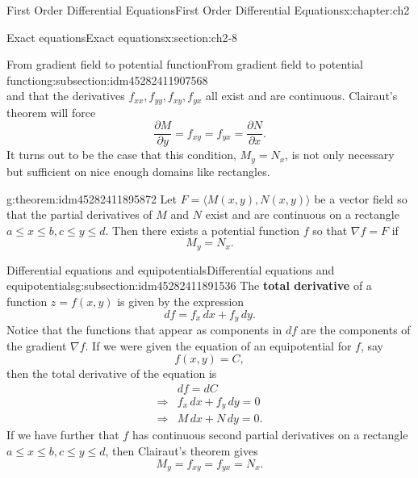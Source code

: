 \documentclass[oneside,10pt,]{book}
\newcommand{\terminology}[1]{\textbf{#1}}
\numberwithin{equation}{section}
\numberwithin{equation}{section}
\newcommand{\amp}{&}
\begin{document}
\begin{chapterptx}{First Order Differential Equations}{}{First Order Differential Equations}{}{}{x:chapter:ch2}
\begin{sectionptx}{Exact equations}{}{Exact equations}{}{}{x:section:ch2-8}
\begin{subsectionptx}{From gradient field to potential function}{}{From gradient field to potential function}{}{}{g:subsection:idm45282411907568}
\begin{equation*}
\end{equation*}
and that the derivatives \(f_{xx}, f_{yy}, f_{xy}, f_{yx}\) all exist and are continuous. Clairaut's theorem will force%
\begin{equation*}
\frac{\partial M}{\partial y} = f_{xy} = f_{yx} = \frac{\partial N}{\partial x}\text{.}
\end{equation*}
It turns out to be the case that this condition, \(M_y = N_x\), is not only necessary but sufficient on nice enough domains like rectangles.%
\begin{theorem}{}{}{g:theorem:idm45282411895872}%
Let \(F = \langle M(x,y), N(x,y) \rangle\) be a vector field so that the partial derivatives of \(M\) and \(N\) exist and are continuous on a rectangle \(a \leq x \leq b, c \leq y \leq d\). Then there exists a potential function \(f\) so that \(\nabla f = F\) if%
\begin{equation*}
M_y = N_x.
\end{equation*}
%
\end{theorem}
\end{subsectionptx}
%
%
\typeout{************************************************}
\typeout{************************************************}
%
\begin{subsectionptx}{Differential equations and equipotentials}{}{Differential equations and equipotentials}{}{}{g:subsection:idm45282411891536}
The \terminology{total derivative} of a function \(z = f(x,y)\) is given by the expression%
\begin{equation*}
df = f_x \, dx + f_y \, dy.
\end{equation*}
Notice that the functions that appear as components in \(df\) are the components of the gradient \(\nabla f\). If we were given the equation of an equipotential for \(f\), say%
\begin{equation*}
f(x, y) = C,
\end{equation*}
then the total derivative of the equation is%
\begin{align*}
\amp df = dC \\
\Rightarrow \amp f_x \, dx + f_y \, dy = 0\\
\Rightarrow \amp M \, dx + N \, dy = 0.
\end{align*}
If we have further that \(f\) has continuous second partial derivatives on a rectangle \(a \leq x \leq b, c \leq y \leq d\), then Clairaut's theorem gives%
\begin{equation*}
M_y = f_{xy} = f_{yx} = N_x.

\end{equation*}
\end{subsectionptx}
\end{sectionptx}
\end{chapterptx}
\end{document}
